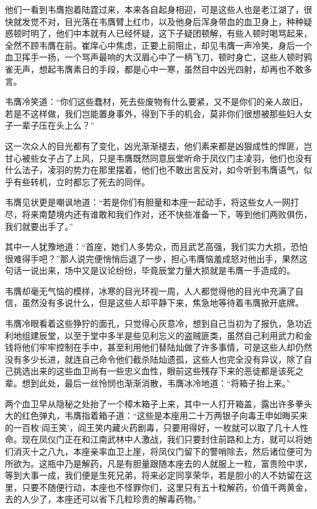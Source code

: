 他们一看到韦膺抱着陆霆过来，本来各自起身相迎，可是这些人也是老江湖了，很快就发觉不对，目光落在韦膺臂上红巾，以及他身后浑身带血的血卫身上，种种疑惑顿时明了，他们中本就有人已经怀疑，这下子疑团顿解，有些人顿时喝骂起来，全然不顾韦膺在前。崔庠心中焦虑，正要上前阻止，却见韦膺一声冷笑，身后一个血卫挥手一扬，一个骂声最响的大汉眉心中了一柄飞刀，顿时身亡，这些人顿时鸦雀无声，想起韦膺素日的手段，都是心中一寒，虽然目中凶光四射，却再也不敢多言。

韦膺冷笑道：“你们这些蠢材，死去些废物有什么要紧，又不是你们的亲人故旧，若是不这样做，我们岂能置身事外，得到下手的机会，莫非你们很想被那些妇人女子一辈子压在头上么？”

这一次众人的目光都有了变化，凶光渐渐褪去，他们素来都是凶狠成性的悍匪，岂甘心被些女子占了上风，只是韦膺既然同意辰堂听命于凤仪门主凌羽，他们也没有什么法子，凌羽的势力在那里摆着，他们也不敢出言反对，如今听到韦膺语气，似乎有些转机，立时都忘了死去的同伴。

韦膺见状更是嘲讽地道：“若是你们有胆量和本座一起动手，将这些女人一网打尽，将来南楚境内还有谁敢和我们作对，还不快些准备一下，等到他们两败俱伤，我们就要出手了。”

其中一人犹豫地道：“首座，她们人多势众，而且武艺高强，我们实力大损，恐怕很难得手吧？”那人说完便悄悄后退了一步，担心韦膺恼羞成怒对他出手，果然这句话一说出来，场中又是议论纷纷，毕竟辰堂力量大损就是韦膺一手造成的。

韦膺却毫无气恼的模样，冰寒的目光环视一周，人人都觉得他的目光中充满了自信，虽然没有多说什么，但是这些人却平静下来，焦急地等待着韦膺掀开底牌。

韦膺冷眼看着这些狰狞的面孔，只觉得心灰意冷，想到自己当初为了报仇，急功近利地组建辰堂，以至于堂中多半是些见利忘义的盗贼匪类，虽然自己利用武力和金钱将他们牢牢控制在手中，甚至利用他们替陆灿做了许多事情，可是这些人却仍然没有多少长进，就连自己命令他们截杀陆灿遗孤，这些人也完全没有异议，除了自己挑选出来的这些血卫尚有一些忠义血性，眼前这些残存下来的恶徒都是该死之辈。想到此处，最后一丝怜悯也渐渐消散，韦膺冰冷地道：“将箱子抬上来。”

两个血卫早从隐秘之处抬了一个樟木箱子上来，其中一人打开箱盖，露出许多拳头大的红色弹丸，韦膺指着箱子道：“这些是本座用二十万两银子向毒王申如晦买来的一百枚‘阎王笑’，阎王笑内藏火药剧毒，只要用得好，一枚就可以取了几十人性命。现在凤仪门正在和江南武林中人激战，我们只要封住前路和上方，就可以将她们消灭十之八九，本座亲率血卫上崖，将凤仪门留下的警哨除去，然后诸位便可为所欲为。这瓶中乃是解药，凡是有胆量跟随本座去的人就服上一粒，富贵险中求，等到大事一成，我们便是生死兄弟，将来必定同享荣华，若是胆小的人不妨留在这里，只要不随便行动，本座也不怪罪你们，这里只有五十粒解药，价值千两黄金，去的人少了，本座还可以省下几粒珍贵的解毒药物。”

